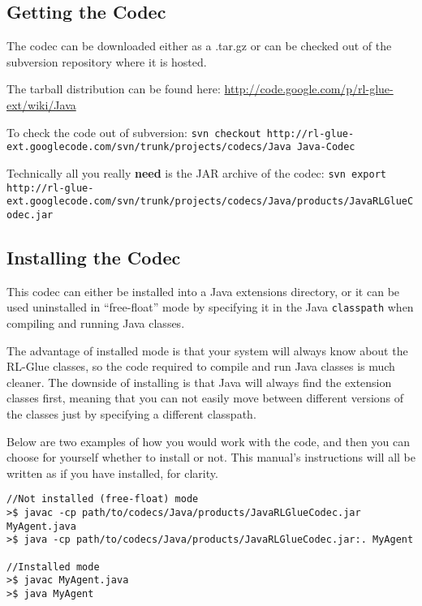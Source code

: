 \documentclass[11pt]{article}
\begin{document}
\subsection{Getting the Codec}
The codec can be downloaded either as a .tar.gz or can be checked out of the subversion repository where it is hosted.

The tarball distribution can be found here:\newline
\url{http://code.google.com/p/rl-glue-ext/wiki/Java}


To check the code out of subversion:\newline
\texttt{svn checkout http://rl-glue-ext.googlecode.com/svn/trunk/projects/codecs/Java Java-Codec}

Technically all you really \textbf{need} is the JAR archive of the codec:\newline
\footnotesize \texttt{svn export http://rl-glue-ext.googlecode.com/svn/trunk/projects/codecs/Java/products/JavaRLGlueCodec.jar} \normalsize

\subsection{Installing the Codec}
This codec can either be installed into a Java extensions directory, or it can be used uninstalled in ``free-float'' mode by specifying it in the Java \texttt{classpath} when compiling and running Java classes.

The advantage of installed mode is that your system will always know about the RL-Glue classes, so the code required to compile and run Java classes is much cleaner.  The downside of installing is that Java will always find the extension classes first, meaning that you can not easily move between different versions of the classes just by specifying a different classpath.

Below are two examples of how you would work with the code, and then you can choose for yourself whether to install or not.  This manual's instructions will all be written as if you have installed, for clarity.

\begin{verbatim}
//Not installed (free-float) mode
>$ javac -cp path/to/codecs/Java/products/JavaRLGlueCodec.jar MyAgent.java
>$ java -cp path/to/codecs/Java/products/JavaRLGlueCodec.jar:. MyAgent

//Installed mode
>$ javac MyAgent.java
>$ java MyAgent
\end{verbatim}
\end{document}
